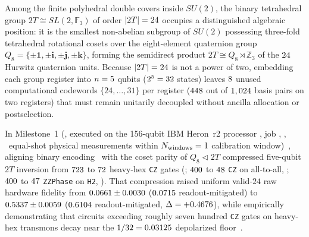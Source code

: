 \documentclass[aps,prx,twocolumn,superscriptaddress,nofootinbib]{revtex4-2}
\begin{document}
Among the finite polyhedral double covers inside $SU(2)$, the binary tetrahedral group $2T \cong SL(2,\mathbb{F}_3)$ of order $|2T| = 24$ occupies a distinguished algebraic position: it is the smallest non-abelian subgroup of $SU(2)$ possessing three-fold tetrahedral rotational cosets over the eight-element quaternion group $Q_8 = \{\pm\mathbf{1},\pm\mathbf{i},\pm\mathbf{j},\pm\mathbf{k}\}$, forming the semidirect product $2T \cong Q_8 \rtimes \mathbb{Z}_3$ of the $24$ Hurwitz quaternion units. Because $|2T| = 24$ is not a power of two, embedding each group register into $n = 5$ qubits ($2^5 = 32$ states) leaves $8$ unused computational codewords $\{24,\dots,31\}$ per register ($448$ out of $1,024$ basis pairs on two registers) that must remain unitarily decoupled without ancilla allocation or postselection.

In Milestone~1 (\btmMoneProtocolId, executed on the 156-qubit IBM Heron~r2 processor \btmMoneBackend, job \btmMoneJobId, \btmMoneTier, \btmMoneShots\ equal-shot physical measurements within $N_{\mathrm{windows}} = 1$ calibration window)~\cite{DavisBT2T001Fez2026}, aligning binary encoding \btmEncVer\ with the coset parity of $Q_8 \triangleleft 2T$ compressed five-qubit $2T$ inversion from $723$ to $72$ heavy-hex \texttt{CZ} gates (\btmMoneFezRatio; $400$ to $48$ \texttt{CZ} on all-to-all, \btmMoneAtaRatio; $400$ to $47$ \texttt{ZZPhase} on \texttt{H2}, \btmMoneTkRatio). That compression raised uniform valid-$24$ raw hardware fidelity from $0.0661 \pm 0.0030$ ($0.0715$ readout-mitigated) to $0.5337 \pm 0.0059$ ($0.6104$ readout-mitigated, $\Delta = +0.4676$), while empirically demonstrating that circuits exceeding roughly seven hundred \texttt{CZ} gates on heavy-hex transmons decay near the $1/32 = 0.03125$ depolarized floor~\cite{DavisBT2T001Fez2026,DavisRO0607Zenodo2026}.
\end{document}
